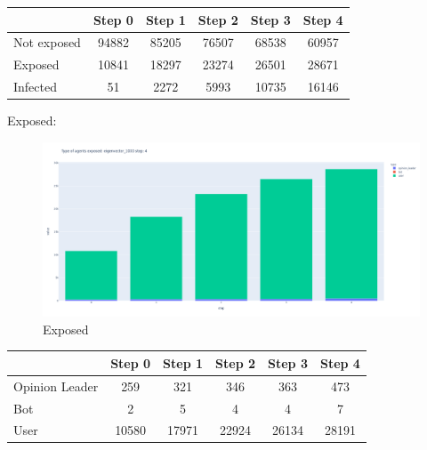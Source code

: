         \begin{table}[H]
            \centering
            \begin{tabular}{|l|c|c|c|c|c|}
            \hline
                        & Step 0 & Step 1 & Step 2 & Step 3 & Step 4 \\ \hline
            Not exposed & 94882  & 85205  & 76507  & 68538  & 60957  \\ \hline
            Exposed     & 10841  & 18297  & 23274  & 26501  & 28671  \\ \hline
            Infected    & 51     & 2272   & 5993   & 10735  & 16146  \\ \hline
            \end{tabular}
        \end{table}
        
        Exposed:
        \begin{figure}[H]
            \includegraphics[width=16cm]{resources/charts/eig_1000_bar.png}
            \caption{Exposed}
            \label{fig:eig_1000_bar}
        \end{figure}
        
        \begin{table}[H]
            \centering
            \begin{tabular}{|l|c|c|c|c|c|}
            \hline
                           & Step 0 & Step 1 & Step 2 & Step 3 & Step 4 \\ \hline
            Opinion Leader & 259    & 321    & 346    & 363    & 473    \\ \hline
            Bot            & 2      & 5      & 4      & 4      & 7      \\ \hline
            User           & 10580  & 17971  & 22924  & 26134  & 28191  \\ \hline
            \end{tabular}
        \end{table}
        
